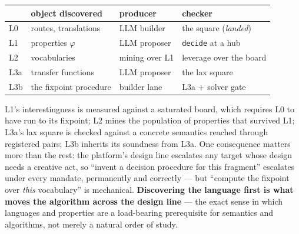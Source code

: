\begin{center}
\footnotesize
\setlength{\tabcolsep}{2.5pt}
\begin{tabular}{@{}llll@{}}
\toprule
 & object discovered & producer & checker \\
\midrule
L0 & routes, translations & LLM builder & the square (\emph{landed}) \\
L1 & properties $\varphi$ & LLM proposer & \texttt{decide} at a hub \\
L2 & vocabularies & mining over L1 & leverage over the board \\
L3a & transfer functions & LLM proposer & the lax square \\
L3b & the fixpoint procedure & builder lane & L3a + solver gate \\
\bottomrule
\end{tabular}
\end{center}

L1's interestingness is measured against a saturated board, which
requires L0 to have run to its fixpoint; L2 mines the population of
properties that survived L1; L3a's lax square is checked against a
concrete semantics reached through registered pairs; L3b inherits
its soundness from L3a. One consequence matters more than the rest:
the platform's design line escalates any target whose design needs a
creative act, so ``invent a decision procedure for this fragment''
escalates under every mandate, permanently and correctly --- but
``compute the fixpoint over \emph{this} vocabulary'' is mechanical.
\textbf{Discovering the language first is what moves the algorithm
across the design line} --- the exact sense in which languages and
properties are a load-bearing prerequisite for semantics and
algorithms, not merely a natural order of study.

